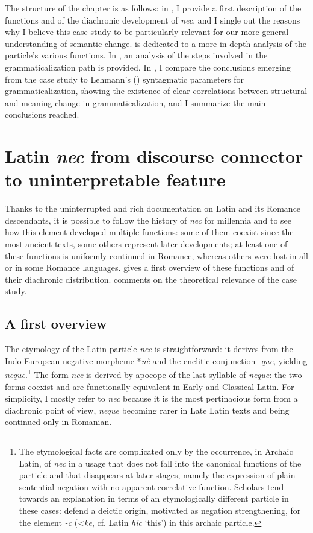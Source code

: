 \documentclass[output=paper]{langsci/langscibook}
\begin{document}
The structure of the chapter is as follows: in , I provide a first description of the functions and of the diachronic development of {\emph{nec}}, and I single out the reasons why I believe this case study to be particularly relevant for our more general understanding of semantic change.  is dedicated to a more in-depth analysis of the particle's various functions. In , an analysis of the steps involved in the grammaticalization path is provided. In , I compare the  conclusions emerging from the case study to Lehmann's (\citeyear{Lehmann15}) syntagmatic parameters for grammaticalization, showing the existence of clear correlations between structural and meaning change in grammaticalization, and I summarize the main conclusions reached.

\section{Latin {\emph{nec}} from discourse connector to uninterpretable feature} \label{generalintro}

Thanks to the uninterrupted and rich documentation on Latin and its Romance descendants, it is possible to follow the history of {\emph{nec}} for millennia and to see how this element developed multiple functions: some of them coexist since the most ancient texts, some others represent later developments; at least one of these functions is uniformly continued in Romance, whereas others were lost in all or in some Romance languages.  gives a first overview of these functions and of their diachronic distribution.  comments on the theoretical relevance of the case study.


\subsection{A first overview} \label{corefacts}

The etymology of the Latin particle {\emph{nec}} is straightforward: it derives from the Indo-European negative morpheme *{\emph{n\u{e}}} and the enclitic conjunction -{\emph{que}}, yielding {\emph{neque}}.{\footnote{The etymological facts are complicated only by the occurrence, in Archaic Latin, of {\emph{nec}} in a usage that does not fall into the canonical functions of the particle and that disappears at later stages, namely the expression of plain sentential negation with no apparent correlative function. Scholars tend towards an explanation in terms of an etymologically different particle in these cases: \citet[29--30]{OrlandiniPoccetti07} defend a deictic origin, motivated as negation strengthening, for the element {\emph{-c}} (\textless *{\emph{ke}}, cf. Latin {\emph{hic}} `this') in this archaic particle.}} The form {\emph{nec}} is derived by apocope of the last syllable of {\emph{neque}}: the two forms coexist and are functionally equivalent in Early and Classical Latin. For simplicity, I mostly refer to {\emph{nec}} because it is the most pertinacious form from a diachronic point of view, {\emph{neque}} becoming rarer in Late Latin texts and being continued only in Romanian.
\end{document}
